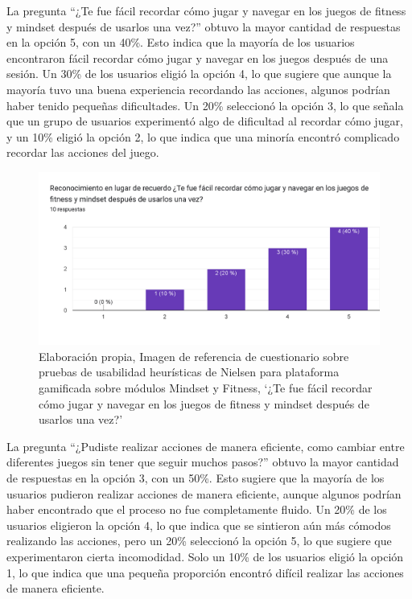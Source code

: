 La pregunta ``¿Te fue fácil recordar cómo jugar y navegar en los juegos de fitness y mindset después de usarlos una vez?'' obtuvo la mayor cantidad de respuestas en la opción 5, con un 40\%. Esto indica que la mayoría de los usuarios encontraron fácil recordar cómo jugar y navegar en los juegos después de una sesión. Un 30\% de los usuarios eligió la opción 4, lo que sugiere que aunque la mayoría tuvo una buena experiencia recordando las acciones, algunos podrían haber tenido pequeñas dificultades. Un 20\% seleccionó la opción 3, lo que señala que un grupo de usuarios experimentó algo de dificultad al recordar cómo jugar, y un 10\% eligió la opción 2, lo que indica que una minoría encontró complicado recordar las acciones del juego.

\begin{figure}[H]
  \centering
  \includegraphics[width=0.7\linewidth]{Imagenes/Nc6.png}
  \caption{Elaboración propia, Imagen de referencia de cuestionario sobre pruebas de usabilidad heurísticas de Nielsen para plataforma gamificada sobre módulos Mindset y Fitness, `¿Te fue fácil recordar cómo jugar y navegar en los juegos de fitness y mindset después de usarlos una vez?'}

  \label{fig:cuestionario6nielsen}
\end{figure}

La pregunta ``¿Pudiste realizar acciones de manera eficiente, como cambiar entre diferentes juegos sin tener que seguir muchos pasos?'' obtuvo la mayor cantidad de respuestas en la opción 3, con un 50\%. Esto sugiere que la mayoría de los usuarios pudieron realizar acciones de manera eficiente, aunque algunos podrían haber encontrado que el proceso no fue completamente fluido. Un 20\% de los usuarios eligieron la opción 4, lo que indica que se sintieron aún más cómodos realizando las acciones, pero un 20\% seleccionó la opción 5, lo que sugiere que experimentaron cierta incomodidad. Solo un 10\% de los usuarios eligió la opción 1, lo que indica que una pequeña proporción encontró difícil realizar las acciones de manera eficiente.

